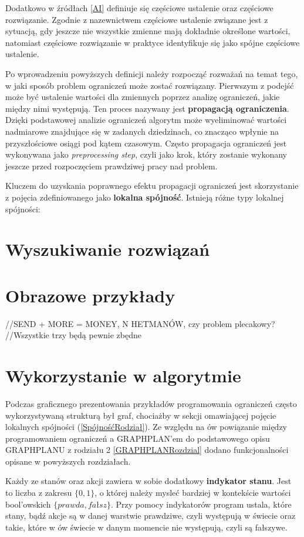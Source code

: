     Dodatkowo w źródłach \ref{AI} definiuje się częściowe ustalenie oraz częściowe rozwiązanie. Zgodnie z nazewnictwem 
    częściowe ustalenie związane jest z sytuacją, gdy jeszcze nie wszystkie zmienne mają dokładnie określone wartości, natomiast 
    częściowe rozwiązanie w praktyce identyfikuje się jako spójne częściowe ustalenie.

    Po wprowadzeniu powyższych definicji należy rozpocząć rozważań na temat tego, w jaki sposób 
    problem ograniczeń może zostać rozwiązany. Pierwszym z podejść może być ustalenie wartości dla zmiennych poprzez 
    analizę ograniczeń, jakie między nimi występują. Ten proces nazywany jest \textbf{propagacją ograniczenia}. Dzięki 
    podstawowej analizie ograniczeń algorytm może wyeliminować wartości nadmiarowe znajdujące się w zadanych dziedzinach, co znacząco wpłynie 
    na przyszłościowe osiągi pod kątem czasowym. Często propagacja ograniczeń jest wykonywana jako \textit{preprocessing step}, czyli 
    jako krok, który zostanie wykonany jeszcze przed rozpoczęciem prawdziwej pracy nad problem. 
    
    Kluczem do uzyskania poprawnego efektu propagacji ograniczeń jest skorzystanie z pojęcia zdefiniowanego jako \textbf{lokalna spójność}.
    Istnieją różne typy lokalnej spójności:

\section{Wyszukiwanie rozwiązań}


\section{Obrazowe przykłady}

//SEND + MORE = MONEY, N HETMANÓW, czy problem plecakowy?
//Wszystkie trzy będą pewnie zbędne

\section{Wykorzystanie w algorytmie}

    Podczas graficznego prezentowania przykładów programowania ograniczeń często wykorzystywaną strukturą był graf, chociażby w sekcji omawiającej 
    pojęcie lokalnych spójności (\ref{SpójnośćRodział}). Ze względu na ów powiązanie między programowaniem ograniczeń a GRAPHPLAN'em do podstawowego opisu GRAPHPLANU z rodziału 2 
    \ref{GRAPHPLANRozdzial} dodano funkcjonalności opisane w powyższych rozdziałach. 

    Każdy ze stanów oraz akcji zawiera w sobie dodatkowy \textbf{indykator stanu}. Jest to liczba z zakresu $\{0,1\}$, o której 
    należy mysleć bardziej w kontekście wartości bool'owskich $\{prawda,fałsz\}$. Przy pomocy indykatorów program ustala, które stany, bądź akcje 
    są w danej warstwie prawdziwe, czyli występują w świecie oraz takie, które w ów świecie w danym momencie nie występują, czyli są fałszywe. 
    

